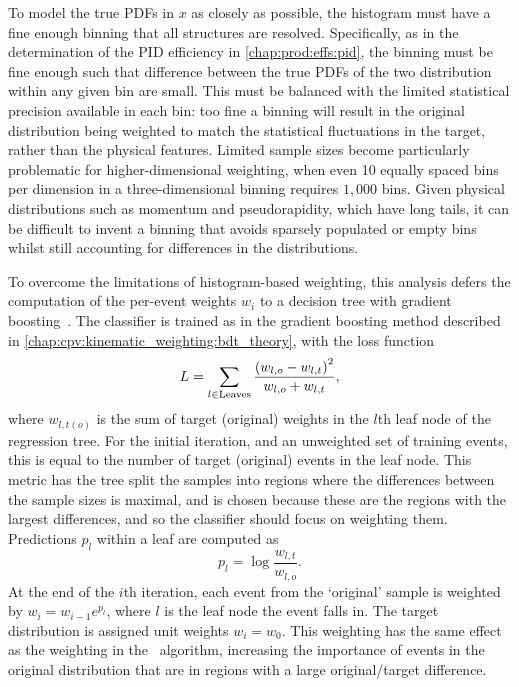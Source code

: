 To model the true \aclp{PDF} in $x$ as closely as possible, the histogram must 
have a fine enough binning that all structures are resolved.
Specifically, as in the determination of the \ac{PID} efficiency in 
\cref{chap:prod:effs:pid}, the binning must be fine enough such that difference 
between the true \acp{PDF} of the two distribution within any given bin are 
small.
This must be balanced with the limited statistical precision available in each 
bin: too fine a binning will result in the original distribution being weighted 
to match the statistical fluctuations in the target, rather than the physical 
features.
Limited sample sizes become particularly problematic for higher-dimensional 
weighting, when even 10 equally spaced bins per dimension in a 
three-dimensional binning requires $1,000$ bins.
Given physical distributions such as momentum and pseudorapidity, which have 
long tails, it can be difficult to invent a binning that avoids sparsely 
populated or empty bins whilst still accounting for differences in the 
distributions.

To overcome the limitations of histogram-based weighting, this analysis defers 
the computation of the per-event weights $w_{i}$ to a decision tree with 
gradient boosting~\cite{Rogozhnikov:2016bdp}.
The classifier is trained as in the gradient boosting method described in 
\cref{chap:cpv:kinematic_weighting:bdt_theory}, with the loss function
\begin{equation}
  L = \sum_{l \in \text{Leaves}} \frac{%
    {(w_{l,o} - w_{l,t})}^{2}
  }{%
    w_{l,o} + w_{l,t}
  },
\end{equation}
where $w_{l,t(o)}$ is the sum of target (original) weights in the $l$th leaf 
node of the regression tree.
For the initial iteration, and an unweighted set of training events, this is 
equal to the number of target (original) events in the leaf node.
This metric has the tree split the samples into regions where the differences 
between the sample sizes is maximal, and is chosen because these are the 
regions with the largest differences, and so the classifier should focus on 
weighting them.
Predictions $p_{l}$ within a leaf are computed as
\begin{equation}
  p_{l} = \log{\frac{w_{l,t}}{w_{l,o}}}.
\end{equation}
At the end of the $i$th iteration, each event from the `original' sample is 
weighted by $w_{i} = w_{i - 1}e^{p_{l}}$, where $l$ is the leaf node the event 
falls in.
The target distribution is assigned unit weights $w_{i} = w_{0}$.
This weighting has the same effect as the weighting in the \adaboost\ 
algorithm, increasing the importance of events in the original distribution 
that are in regions with a large original/target difference.

